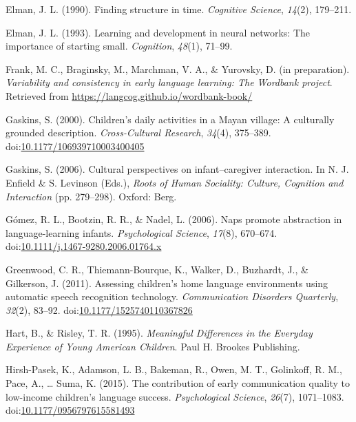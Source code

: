 \documentclass[,man,floatsintext]{apa6}
\begin{document}
\hypertarget{ref-elman1990finding}{}
Elman, J. L. (1990). Finding structure in time. \emph{Cognitive
Science}, \emph{14}(2), 179--211.

\hypertarget{ref-elman1993learning}{}
Elman, J. L. (1993). Learning and development in neural networks: The
importance of starting small. \emph{Cognition}, \emph{48}(1), 71--99.

\hypertarget{ref-frankIPvariability}{}
Frank, M. C., Braginsky, M., Marchman, V. A., \& Yurovsky, D. (in
preparation). \emph{Variability and consistency in early language
learning: The Wordbank project}. Retrieved from
\url{https://langcog.github.io/wordbank-book/}

\hypertarget{ref-gaskins2000childrens}{}
Gaskins, S. (2000). Children's daily activities in a Mayan village: A
culturally grounded description. \emph{Cross-Cultural Research},
\emph{34}(4), 375--389.
doi:\href{https://doi.org/10.1177/106939710003400405}{10.1177/106939710003400405}

\hypertarget{ref-gaskins2006cultural}{}
Gaskins, S. (2006). Cultural perspectives on infant--caregiver
interaction. In N. J. Enfield \& S. Levinson (Eds.), \emph{Roots of
Human Sociality: Culture, Cognition and Interaction} (pp. 279--298).
Oxford: Berg.

\hypertarget{ref-gomez2006naps}{}
Gómez, R. L., Bootzin, R. R., \& Nadel, L. (2006). Naps promote
abstraction in language-learning infants. \emph{Psychological Science},
\emph{17}(8), 670--674.
doi:\href{https://doi.org/10.1111/j.1467-9280.2006.01764.x}{10.1111/j.1467-9280.2006.01764.x}

\hypertarget{ref-greenwood2011assessing}{}
Greenwood, C. R., Thiemann-Bourque, K., Walker, D., Buzhardt, J., \&
Gilkerson, J. (2011). Assessing children's home language environments
using automatic speech recognition technology. \emph{Communication
Disorders Quarterly}, \emph{32}(2), 83--92.
doi:\href{https://doi.org/10.1177/1525740110367826}{10.1177/1525740110367826}

\hypertarget{ref-hart1995meaningful}{}
Hart, B., \& Risley, T. R. (1995). \emph{Meaningful Differences in the
Everyday Experience of Young American Children}. Paul H. Brookes
Publishing.

\hypertarget{ref-hirshpasek2015contribution}{}
Hirsh-Pasek, K., Adamson, L. B., Bakeman, R., Owen, M. T., Golinkoff, R.
M., Pace, A., \ldots{} Suma, K. (2015). The contribution of early
communication quality to low-income children's language success.
\emph{Psychological Science}, \emph{26}(7), 1071--1083.
doi:\href{https://doi.org/10.1177/0956797615581493}{10.1177/0956797615581493}
\end{document}
